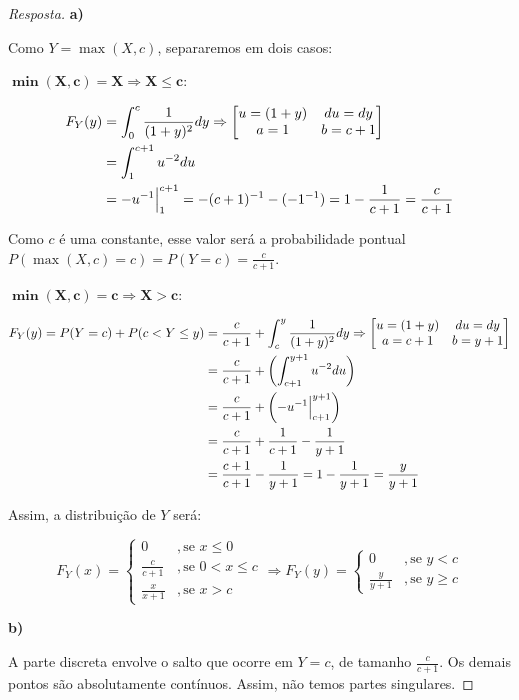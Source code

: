 \documentclass[
]{article}
\theoremstyle{definition}
\theoremstyle{definition}
\theoremstyle{definition}
\theoremstyle{definition}
\theoremstyle{remark}
\begin{document}
\begin{proof}[Resposta]
\textbf{a)}

Como \(Y = \max(X,c)\), separaremos em dois casos:

\(\mathbf{\min(X,c) = X} \Rightarrow \mathbf{X \le c}\):

\begin{align*}
F_{Y}(y) &= \int_{0}^{c}\frac{1}{(1+y)^{2}}dy \Rightarrow \begin{bmatrix}
u = (1+y) & du = dy \\
a = 1 & b = c+1
\end{bmatrix}\\
&= \int_{1}^{c+1}u^{-2}du \\
&= -u^{-1}\Big{|}_{1}^{c+1} = -(c+1)^{-1} - (-1^{-1}) = 1 - \frac{1}{c+1} = \frac{c}{c+1}
\end{align*}

Como \(c\) é uma constante, esse valor será a probabilidade pontual \(P(\max(X,c) = c) = P(Y = c) = \frac{c}{c+1}\).

\(\mathbf{\min(X,c) = c} \Rightarrow \mathbf{X > c}\):

\begin{align*}
F_{Y}(y) = P(Y = c) + P(c < Y \le y) &= \frac{c}{c+1} + \int_{c}^{y}\frac{1}{(1+y)^{2}}dy \Rightarrow \begin{bmatrix}
u = (1+y) & du = dy \\
a = c+1 & b = y+1
\end{bmatrix}\\
&= \frac{c}{c+1} + \left(\int_{c+1}^{y+1}u^{-2}du\right) \\
&= \frac{c}{c+1} + \left(-u^{-1}\Big{|}_{c+1}^{y+1}\right) \\
&= \frac{c}{c+1} + \frac{1}{c+1} - \frac{1}{y+1} \\
&= \frac{c + 1}{c + 1} - \frac{1}{y+1} = 1 - \frac{1}{y+1} = \frac{y}{y+1}
\end{align*}

Assim, a distribuição de \(Y\) será:

\begin{equation*}
F_{Y}(x) = \begin{cases}
0 &,\text{se }x \le 0 \\
\frac{c}{c+1} &,\text{se } 0 < x \le c \\
\frac{x}{x+1} &,\text{se } x > c
\end{cases} \Rightarrow F_{Y}(y) = \begin{cases}
0 &,\text{se } y < c \\
\frac{y}{y+1} &,\text{se } y \ge c
\end{cases}
\end{equation*}

\textbf{b)}

A parte discreta envolve o salto que ocorre em \(Y = c\), de tamanho \(\frac{c}{c+1}\). Os demais pontos são absolutamente contínuos. Assim, não temos partes singulares.
\end{proof}
\end{document}
